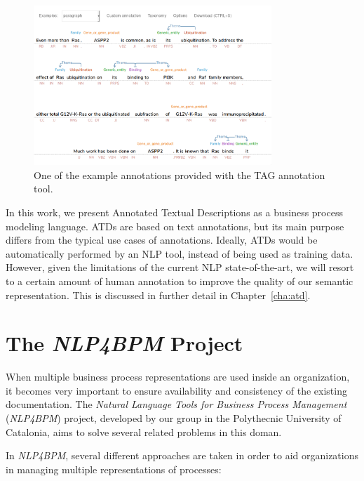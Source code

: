 \begin{figure}[htb]
  \centering
  \includegraphics[width=0.8\textwidth]{figures/tag}
  \caption{One of the example annotations provided with the TAG
    annotation tool.}
  \label{fig:tag}
\end{figure}

In this work, we present Annotated Textual Descriptions as a business process
modeling language. ATDs are based on text annotations, but its main purpose
differs from the typical use cases of annotations. Ideally, ATDs would be
automatically performed by an NLP tool, instead of being used as training data.
However, given the limitations of the current NLP state-of-the-art, we will
resort to a certain amount of human annotation to improve the quality of our
semantic representation. This is discussed in further detail in Chapter~\ref{cha:atd}.

\section{The \emph{NLP4BPM} Project}
\label{sec:background_nlp4bpm}

When multiple business process representations are used inside an organization,
it becomes very important to ensure availability and consistency of the existing
documentation. The \emph{Natural Language Tools for Business Process Management}
(\emph{NLP4BPM}) project, developed by our group in the Polythecnic University
of Catalonia, aims to solve several related problems in this doman.

In \emph{NLP4BPM}, several different approaches are taken in order to aid
organizations in managing multiple representations of processes:

